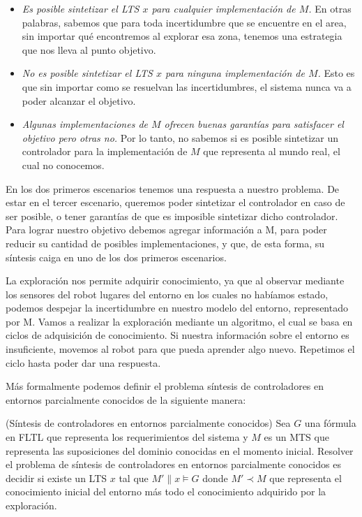 \begin{itemize}

\item
\textit{Es posible sintetizar el LTS $x$ para cualquier implementación de $M$.} 
En otras 
palabras, sabemos que para toda incertidumbre que se encuentre en el area, sin 
importar qué encontremos al explorar esa zona, tenemos una estrategia que nos 
lleva al punto objetivo.

\item
\textit{No es posible sintetizar el LTS $x$ para ninguna implementación de 
$M$.} Esto es que sin importar como se resuelvan las incertidumbres, el sistema 
nunca va a poder alcanzar el objetivo.

\item
\textit{Algunas implementaciones de $M$ ofrecen buenas garantías para 
satisfacer el 
objetivo pero otras no. }
Por lo tanto, no sabemos si es posible sintetizar un controlador para la implementación de $M$ que representa al mundo real, el cual no conocemos.

\end{itemize}


En los dos primeros escenarios tenemos una respuesta a nuestro problema. De estar en el tercer escenario, queremos poder sintetizar 
el controlador en caso de ser posible, o tener garantías de que es imposible sintetizar dicho controlador. Para lograr nuestro objetivo 
debemos agregar información a M, para poder reducir su cantidad de posibles implementaciones, y que, de esta forma, su síntesis caiga 
en uno de los dos primeros escenarios.


La exploración nos permite adquirir conocimiento, ya que al observar mediante los sensores del robot lugares del entorno en los cuales 
no habíamos estado, podemos despejar la incertidumbre en nuestro modelo del entorno, representado por M. Vamos a realizar la exploración 
mediante un algoritmo, el cual se basa en ciclos de adquisición de conocimiento. Si nuestra información sobre el entorno es insuficiente, 
movemos al robot para que pueda aprender algo nuevo. Repetimos el ciclo hasta poder dar una respuesta.

Más formalmente podemos definir el problema síntesis de controladores en entornos parcialmente conocidos de la siguiente manera:

\begin{definition}{(Síntesis de controladores en entornos parcialmente conocidos)}
Sea $G$ una fórmula en FLTL que representa los requerimientos del sistema y $M$ es un MTS que representa las suposiciones del dominio conocidas en el momento inicial. Resolver el problema de síntesis de controladores en entornos parcialmente conocidos es decidir si existe un LTS $x$ tal que $M' \| x \models G$ donde $M' \prec M$ que representa el conocimiento inicial del entorno más todo el conocimiento adquirido por la exploración.
\end{definition}

